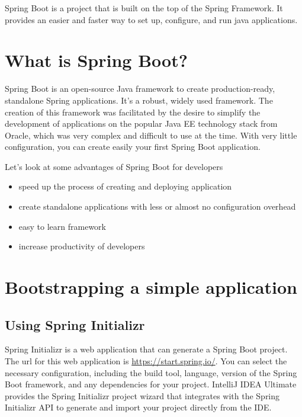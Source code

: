 Spring Boot is a project that is built on the top of the Spring Framework. It provides an easier and faster way to set up, configure, and run java applications.

    
\section{What is Spring Boot?}
 
Spring Boot is an open-source Java framework to create production-ready,  standalone Spring applications. It's a robust, widely used framework. The creation of this framework was facilitated by the desire to simplify the development of applications on the popular Java EE technology stack from Oracle, which was very complex and difficult to use at the time. With very little configuration, you can create easily your first Spring Boot application.

Let's look at some advantages of Spring Boot for developers 
\begin{itemize}
\item speed up the process of creating and deploying application
\item create standalone applications with less or almost no configuration overhead
\item easy to learn framework
\item increase productivity of developers
\end{itemize}

\section{Bootstrapping a simple application}

\subsection{Using Spring Initializr}
Spring Initializr is a web application that can generate a Spring Boot project.
The url for this web application is \url{https://start.spring.io/}. You can select the necessary configuration, including the build tool, language, version of the Spring Boot framework, and any dependencies for your project. IntelliJ IDEA Ultimate provides the Spring Initializr project wizard that integrates with the Spring Initializr API to generate and import your project directly from the IDE.

